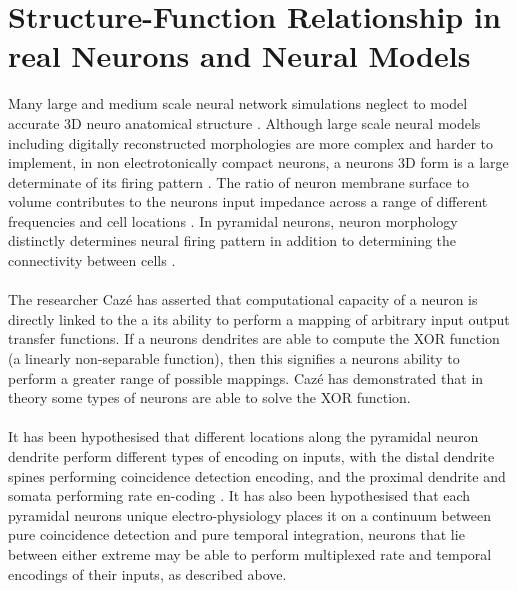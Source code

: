 \documentclass[a4paper,11pt]{article}
\begin{document}
\section{Structure-Function Relationship in real Neurons and Neural Models}
Many large and medium scale neural network simulations neglect to model accurate 3D neuro anatomical structure \cite{kerr2012electrostimulation} \cite{neymotin2011synaptic} \cite{cutsuridis2010encoding}. Although large scale neural models including digitally reconstructed morphologies are more complex and harder to implement, in non electrotonically compact neurons, a neurons 3D form is a large determinate of its firing pattern \cite{mainen1996influence}. The ratio of neuron membrane surface to volume contributes to the neurons input impedance across a range of different frequencies and cell locations \cite{carnevale1997comparative}. In pyramidal neurons, neuron morphology distinctly determines neural firing pattern in addition to determining the connectivity between cells \cite{mainen1996influence}\cite{cuntz2011trees}\cite{branco2011synaptic}\cite{torben2008evol}.\\  
\\
The researcher Cazé has asserted that computational capacity of a neuron is directly linked to the a its ability to perform a mapping of arbitrary input output transfer functions. If a neurons dendrites are able to compute the XOR function (a linearly non-separable function), then this signifies a neurons ability to perform a greater range of possible mappings. Cazé has demonstrated that in theory some types of neurons are able to solve the XOR function\cite{caze2013passive}.\\
\\
It has been hypothesised that different locations along the pyramidal neuron dendrite perform different types of encoding on inputs, with the distal dendrite spines performing coincidence detection encoding, and the proximal dendrite and somata performing rate en-coding \cite{branco2011synaptic}. It has also been hypothesised that each pyramidal neurons unique electro-physiology places it on a continuum between pure coincidence detection and pure temporal integration, neurons that lie between either extreme may be able to perform multiplexed rate and temporal encodings of their inputs, as described above.\\ 
\end{document}
